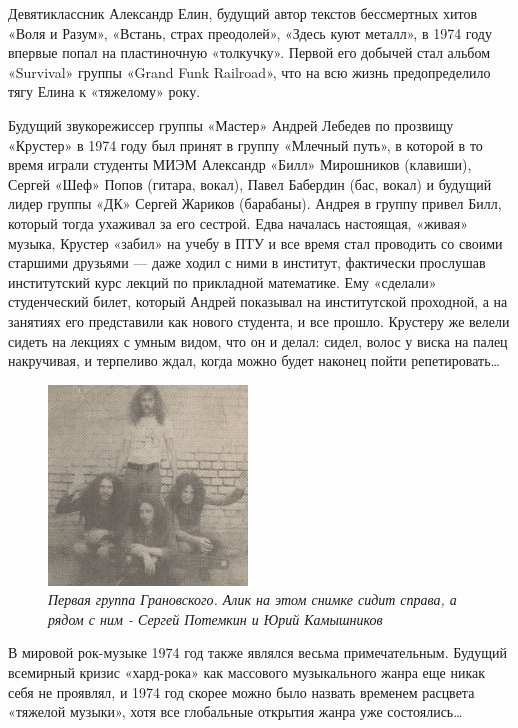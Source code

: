 \documentclass[16pt,a5paper,oneside]{book}
\begin{document}
Девятиклассник Александр Елин, будущий автор текстов бессмертных хитов «Воля и Разум», «Встань, страх преодолей»,
«Здесь куют металл», в 1974 году впервые попал на пластиночную «толкучку». Первой его добычей стал альбом «Survival»
группы «Grand Funk Railroad», что на всю жизнь предопределило тягу Елина к «тяжелому» року.

Будущий звукорежиссер группы «Мастер» Андрей Лебедев по прозвищу «Крустер» в 1974 году был принят в группу «Млечный
путь», в которой в то время играли студенты МИЭМ Александр «Билл» Мирошников (клавиши), Сергей «Шеф» Попов (гитара,
вокал), Павел Бабердин (бас, вокал) и будущий лидер группы «ДК» Сергей Жариков (барабаны). Андрея в группу привел Билл,
который тогда ухаживал за его сестрой. Едва началась настоящая, «живая» музыка, Крустер «забил» на учебу в ПТУ и все
время стал проводить со своими старшими друзьями — даже ходил с ними в институт, фактически прослушав институтский курс
лекций по прикладной математике. Ему «сделали» студенческий билет, который Андрей показывал на институтской проходной,
а на занятиях его представили как нового студента, и все прошло. Крустеру же велели сидеть на лекциях с умным видом, что
он и делал: сидел, волос у виска на палец накручивая, и терпеливо ждал, когда можно будет наконец пойти
репетировать\ldots

\begin{figure}
    \centering
    \includegraphics[scale=0.8]{Image02}
    \caption{\textit{
        Первая группа Грановского. Алик на этом снимке сидит справа, а рядом с ним - Сергей Потемкин и Юрий Камышников
    }}
\end{figure}

В мировой рок-музыке 1974 год также являлся весьма примечательным. Будущий всемирный кризис «хард-рока» как массового
музыкального жанра еще никак себя не проявлял, и 1974 год скорее можно было назвать временем расцвета «тяжелой музыки»,
хотя все глобальные открытия жанра уже состоялись\ldots
\end{document}
